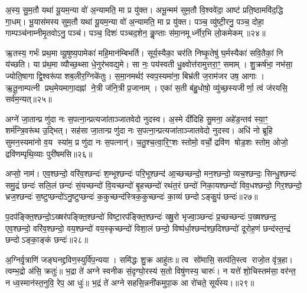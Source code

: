 अ॒स्य॒ सु॒म॒तौ यथा॑ यू॒यम॒न्या वो॑ अ॒न्यामति॒ मा प्र यु॑क्त। अभू॒न्मम॑ सुम॒तौ वि॒श्ववे॑दा॒ आष्ट॑ प्रति॒ष्ठामवि॑द॒द्धि गा॒धम्। भू॒यास॑मस्य सुम॒तौ यथा॑ यू॒यम॒न्या वो॑ अ॒न्यामति॒ मा प्र यु॑क्त। पञ्च॒ व्यु॑ष्टी॒रनु॒ पञ्च॒ दोहा॒ गाम्पञ्च॑नाम्नीमृ॒तवोऽनु॒ पञ्च॑। पञ्च॒ दिशः॑ पञ्चद॒शेन॒ कॢ॒प्ताः स॑मा॒नमूर्ध्नीर॒भि लो॒कमेकम्॥२४॥

ऋ॒तस्य॒ गर्भः॑ प्रथ॒मा व्यू॒षुष्य॒पामेका॑ महि॒मान॑म्बिभर्ति। सूर्य॒स्यैका॒ चर॑ति निष्कृ॒तेषु॑ घ॒र्मस्यैका॑ सवि॒तैकां॒ नि य॑च्छति। या प्र॑थ॒मा व्यौच्छ॒थ्सा धे॒नुर॑भवद्य॒मे। सा नः॒ पय॑स्वती धु॒क्ष्वोत्त॑रामुत्तरा॒ꣳ॒ समाम्। शु॒क्रर्\mbox{}ष॑भा॒ नभ॑सा॒ ज्योति॒षागाद्वि॒श्वरू॑पा शब॒लीर॒ग्निके॑तुः। स॒मा॒नमर्थꣵ॑ स्वप॒स्यमा॑ना॒ बिभ्र॑ती ज॒राम॑जर उष॒ आगाः। ऋ॒तू॒नाम्पत्नी प्रथ॒मेयमागा॒दह्नां ने॒त्री ज॑नि॒त्री प्र॒जानाम्। एका॑ स॒ती ब॑हु॒धोषो॒ व्यु॑च्छ॒स्यजीर्णा॒ त्वं ज॑रयसि॒ सर्व॑म॒न्यत्॥२५॥

{\anuvakamend[{ऊर्ज॒मेका प्रतिमु॒ञ्चमा॑ना भू॒यास॒मेकं॒ पत्न्येका॒न्नविꣳ॑श॒तिश्च॑॥11॥}]}

अग्ने॑ जा॒तान्प्र णु॑दा नः स॒पत्ना॒न्प्रत्यजा॑ताञ्जातवेदो नुदस्व। अ॒स्मे दी॑दिहि सु॒मना॒ अहे॑ड॒न्तव॑ स्या॒ꣳ॒ शर्म॑न्त्रि॒वरू॑थ उ॒द्भित्। सह॑सा जा॒तान्प्र णु॑दा नः स॒पत्ना॒न्प्रत्यजा॑ताञ्जातवेदो नुदस्व। अधि॑ नो ब्रूहि सुमन॒स्यमा॑नो व॒य स्या॑म॒ प्र णु॑दा नः स॒पत्नान्॑। च॒तु॒श्च॒त्वा॒रि॒ꣳ॒शः स्तोमो॒ वर्चो॒ द्रवि॑ण षोड॒शः स्तोम॒ ओजो॒ द्रवि॑णम्पृथि॒व्याः पुरी॑षमसि॥२६॥

अप्सो॒ नाम॑। एव॒श्छन्दो॒ वरि॑व॒श्छन्दः॑ श॒म्भूश्छन्दः॑ परि॒भूश्छन्द॑ आ॒च्छच्छन्दो॒ मन॒श्छन्दो॒ व्यच॒श्छन्दः॒ सिन्धु॒श्छन्दः॑ समु॒द्रं छन्दः॑ सलि॒लं छन्दः॑ सं॒यच्छन्दो॑ वि॒यच्छन्दो॑ बृ॒हच्छन्दो॑ रथंत॒रं छन्दो॑ निका॒यश्छन्दो॑ विव॒धश्छन्दो॒ गिर॒श्छन्दो॒ भ्रज॒श्छन्दः॑ स॒ष्टुप्छन्दो॑ऽनु॒ष्टुप्छन्दः॑ क॒कुच्छन्द॑स्त्रिक॒कुच्छन्दः॑ का॒व्यं छन्दोऽङ्कु॒पं छन्दः॑॥२७॥

प॒दप॑ङ्क्ति॒श्छन्दो॒ऽख्षर॑पङ्क्ति॒श्छन्दो॑ विष्टा॒रप॑ङ्क्ति॒श्छन्दः॑ ख्षु॒रो भृज्वा॒ञ्छन्दः॑ प्र॒च्छच्छन्दः॑ प॒ख्षश्छन्द॒ एव॒श्छन्दो॒ वरि॑व॒श्छन्दो॒ वय॒श्छन्दो॑ वय॒स्कृच्छन्दो॑ विशा॒लं छन्दो॒ विष्प॑र्धा॒श्छन्द॑श्छ॒दिश्छन्दो॑ दूरोह॒णं छन्द॑स्त॒न्द्रं छन्दोऽङ्का॒ङ्कं छन्दः॑॥२८॥

{\anuvakamend[{अ॒स्य॒ङ्कु॒पञ्छन्द॒स्त्रय॑स्त्रिशच्च॥12॥}]}

अ॒ग्निर्वृ॒त्राणि॑ जङ्घनद्द्रविण॒स्युर्वि॑प॒न्यया। समि॑द्धः शु॒क्र आहु॑तः॥ त्व सो॑मासि॒ सत्प॑ति॒स्त्व राजो॒त वृ॑त्र॒हा। त्वम्भ॒द्रो अ॑सि॒ क्रतुः॑॥ भ॒द्रा ते॑ अग्ने स्वनीक सं॒दृग्घो॒रस्य॑ स॒तो विषु॑णस्य॒ चारुः॑। न यत्ते॑ शो॒चिस्तम॑सा॒ वर॑न्त॒ न ध्व॒स्मान॑स्त॒नुवि॒ रेप॒ आ धुः॑॥ भ॒द्रं ते॑ अग्ने सहसि॒न्ननी॑कमुपा॒क आ रो॑चते॒ सूर्य॑स्य।॥२९॥

